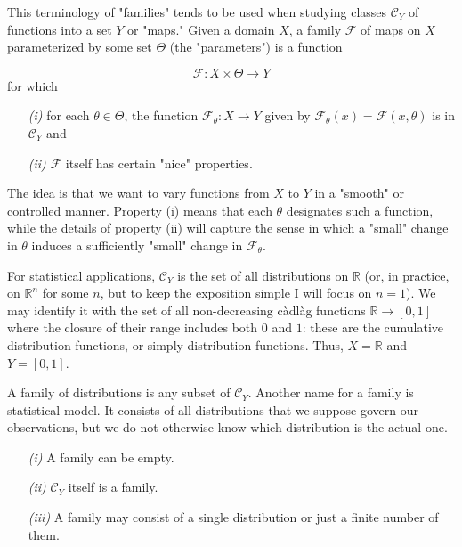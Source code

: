 \documentclass{tufte-handout}
\begin{document}
  \begin{definition}
    This terminology of "families" tends to be used when studying classes $\mathcal C_Y$ of functions into a set $Y$ or "maps." Given a domain $X$, a family $\mathcal F$ of maps on $X$ parameterized by some set $\Theta$ (the "parameters") is a function\cite{def_of_family}

$$\mathcal F : X\times \Theta\to Y$$
for which 
\begin{enumerate}
  \item[\it (i)] for each $\theta\in\Theta$, the function $\mathcal{F}_\theta:X\to Y$ given by $\mathcal{F}_\theta(x)=\mathcal{F}(x,\theta)$ is in $\mathcal{C}_Y$ and 
  \item[\it (ii)] $\mathcal F$ itself has certain "nice" properties.
\end{enumerate}
The idea is that we want to vary functions from $X$ to $Y$ in a "smooth" or controlled manner.  Property (i) means that each $\theta$ designates such a function, while the details of property (ii) will capture the sense in which a "small" change in $\theta$ induces a sufficiently "small" change in $\mathcal{F}_\theta$.

For statistical applications, $\mathcal{C}_Y$ is the set of all distributions on $\mathbb{R}$ (or, in practice, on $\mathbb{R}^n$ for some $n$, but to keep the exposition simple I will focus on $n=1$). We may identify it with the set of all non-decreasing càdlàg functions $\mathbb{R}\to [0,1]$ where the closure of their range includes both $0$ and $1$: these are the cumulative distribution functions, or simply distribution functions.  Thus, $X=\mathbb R$ and $Y=[0,1]$.

A family of distributions is any subset of $\mathcal{C}_Y$. Another name for a family is statistical model.  It consists of all distributions that we suppose govern our observations, but we do not otherwise know which distribution is the actual one.
\begin{enumerate}
  \item[\it (i)]A family can be empty.

  \item[\it (ii)] $\mathcal{C}_Y$ itself is a family.

  \item[\it (iii)] A family may consist of a single distribution or just a finite number of them.

\end{enumerate}
  \end{definition}
\end{document}
